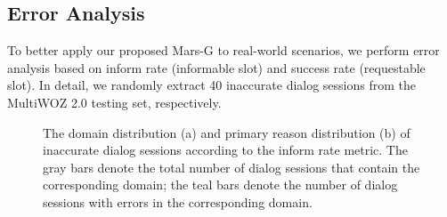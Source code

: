\subsection{ Error Analysis}

 

To better apply our proposed Mars-G to real-world scenarios, we perform error analysis based on inform rate (informable slot) and success rate (requestable slot). In detail,  we randomly extract  40 inaccurate dialog sessions from the MultiWOZ 2.0 testing set, respectively. %
\begin{figure}[t!]
  \centering \scalebox{.88}{
  \subfigure{
  \begin{minipage}{.4\linewidth}
  \centering
  \scalebox{.46}{
\begin{tikzpicture}
\begin{axis}
[
    xbar, enlarge y limits=0.1,
enlarge x limits={0.1,upper},%
    xlabel={\ Dialog Sessions}, symbolic y coords={  Attraction,Restaurant,Hotel,Train,Taxi},%
    ytick=data, nodes near coords, %
    nodes near coords align={horizontal},axis y line*=left,
		axis x line*=left, yticklabel style={rotate=60}]
\addplot  +[color=teal] coordinates { (8,Train) (13,Restaurant) (13,Hotel) (10,Attraction) (0,Taxi)};
\addplot +[color=gray] coordinates {(22,Train) (19,Restaurant) (19,Hotel) (16,Attraction) (6,Taxi)};
\end{axis}
\end{tikzpicture}}
\centerline{(a)}
  \end{minipage}
    }
  \subfigure{
\begin{minipage}{.55\linewidth}
\centering
  \scalebox{.46}{
 \texttt{[image: inform\_error.pdf]}
  }
  \centerline{(b)}\label{fig:inform_b}
\end{minipage}}}
  		\caption{  The domain distribution (a) and primary  reason distribution (b) of inaccurate dialog sessions according to the inform rate metric. The gray bars denote the total number of dialog sessions that contain the corresponding domain; the teal bars denote the number of  dialog sessions with errors in the corresponding domain. }\label{fig:inform}
\end{figure} 

